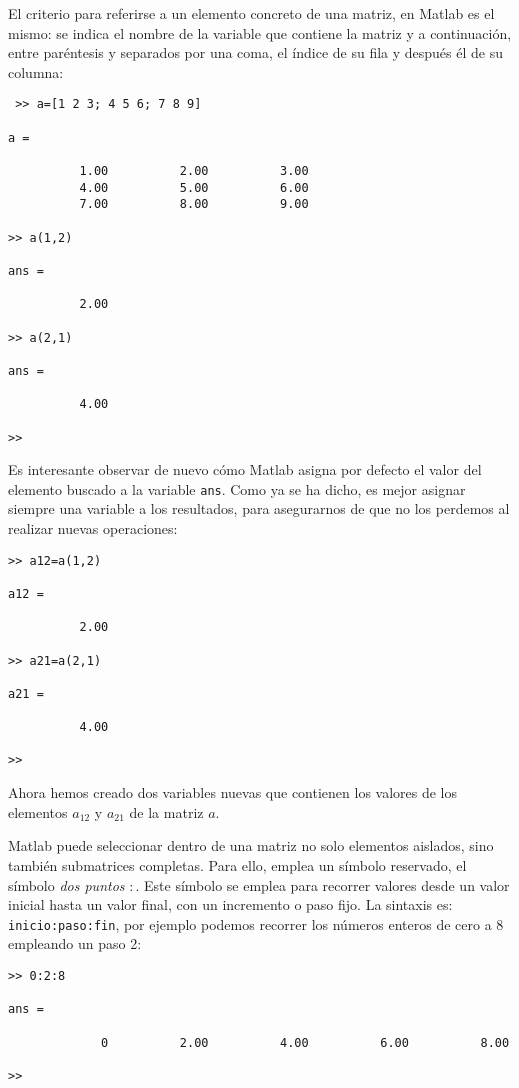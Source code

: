 El criterio para referirse a un elemento concreto de una matriz, en Matlab es el mismo: se indica el nombre de la variable que contiene la matriz y a continuación, entre paréntesis y separados por una coma, el índice de su fila y después él de su columna:
 \begin{verbatim}
 >> a=[1 2 3; 4 5 6; 7 8 9]

a =

          1.00          2.00          3.00
          4.00          5.00          6.00
          7.00          8.00          9.00

>> a(1,2)

ans =

          2.00

>> a(2,1)

ans =

          4.00

>> 
 \end{verbatim}
 
Es interesante observar de nuevo cómo Matlab asigna por defecto el valor del elemento buscado a la variable \texttt{ans}. Como ya se ha dicho, es mejor asignar siempre una variable a los resultados, para asegurarnos de que no los perdemos al realizar nuevas operaciones:
\begin{verbatim}
>> a12=a(1,2)

a12 =

          2.00

>> a21=a(2,1)

a21 =

          4.00

>> 
\end{verbatim}
Ahora hemos creado dos variables nuevas que contienen los valores de los elementos $a_{12}$ y $a_{21}$ de la matriz $a$. 

Matlab puede seleccionar dentro de una matriz no solo elementos aislados, sino también submatrices completas. Para ello, emplea un símbolo reservado, el símbolo \emph{dos puntos} $:$. Este símbolo se emplea para recorrer valores desde un valor inicial hasta un valor final, con un incremento o paso fijo. La sintaxis es: \texttt{inicio:paso:fin}, por ejemplo podemos recorrer los números enteros de cero a 8 empleando un paso 2:
\begin{verbatim}
>> 0:2:8

ans =

             0          2.00          4.00          6.00          8.00

>> 
\end{verbatim}


